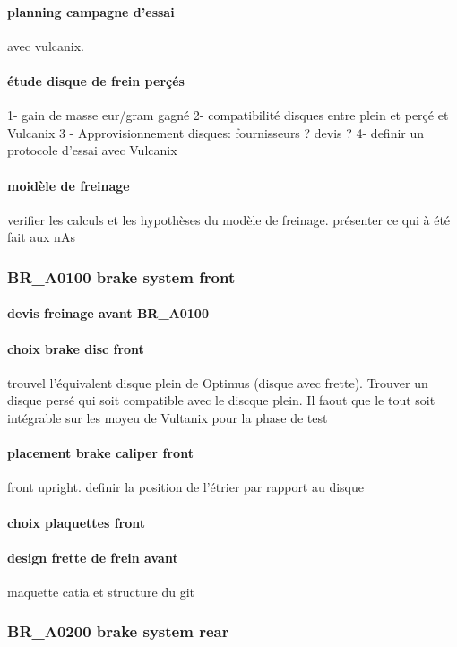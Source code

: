 			\paragraph{planning campagne d'essai} avec vulcanix.
			\paragraph{étude disque de frein perçés} 1- gain de masse eur/gram gagné
2- compatibilité disques entre plein et perçé et Vulcanix
3 - Approvisionnement disques: fournisseurs ? devis ?
4- definir un protocole d'essai avec Vulcanix

			\paragraph{moidèle de freinage} verifier les calculs et les hypothèses du modèle de freinage. présenter ce qui à été fait aux nAs
		\subsubsection*{BR\_A0100 brake system front} 
 \par 
			\paragraph{devis freinage avant BR\_A0100} 
			\paragraph{choix brake disc front} trouvel l'équivalent disque plein de Optimus (disque avec frette). Trouver un disque persé qui soit compatible avec le discque plein. Il faout que le tout soit intégrable sur les moyeu de Vultanix pour la phase de test
			\paragraph{placement brake caliper front} front upright. definir la position de l'étrier par rapport au disque
			\paragraph{choix plaquettes front} 
			\paragraph{design frette de frein avant} maquette catia et structure du git
		\subsubsection*{BR\_A0200 brake system rear} 
 \par 
